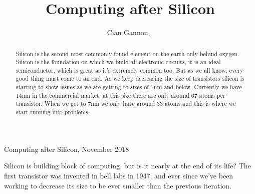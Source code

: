 \documentclass[journal]{IEEEtran}
\begin{document}
%
{Computing after Silicon, November 2018}

\title{Computing after Silicon}
\author{Cian Gannon,~}

\maketitle

\begin{abstract}

Silicon is the second most commonly found element on the earth only behind oxygen. Silicon is the foundation on which we build all electronic circuits, it is an ideal semiconductor, which is great as it's extremely common too. But as we all know, every good thing must come to an end. As we keep decreasing the size of transistors silicon is starting to show issues as we are getting to sizes of 7nm and below. Currently we have 14nm in the commercial market, at this size there are only around 67 atoms per transistor. When we get to 7nm we only have around 33 atoms and this is where we start running into problems.

\end{abstract}

\begin{Introduction}
Silicon is building block of computing, but is it nearly at the end of its life? The first transistor was invented in bell labs in 1947, and ever since we've been working to decrease its size to be ever smaller than the previous iteration. 
\end{Introduction}
\cite{591665}

\printbibliography
\end{document}
